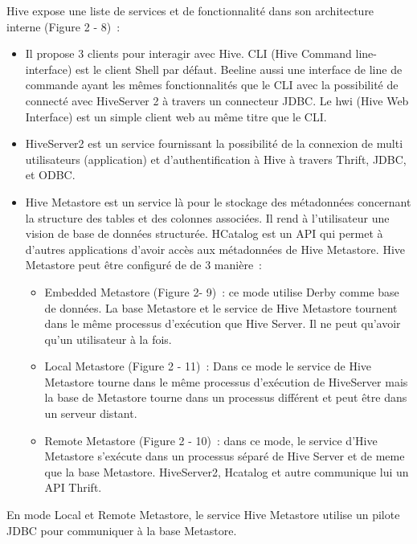 \documentclass[12pt,french]{book}
\begin{document}

Hive expose une liste de services et de fonctionnalité dans son architecture interne (Figure 2 - 8) :

\begin{itemize}
\item
Il propose 3 clients pour interagir avec Hive.  CLI (Hive Command line-interface) est le client Shell par défaut.  Beeline aussi une interface de line de commande ayant les mêmes fonctionnalités que le CLI avec la possibilité de connecté avec HiveServer 2 à travers un connecteur JDBC.  Le hwi (Hive Web Interface) est un simple client web au même titre que le CLI. 
\item
HiveServer2 est un service fournissant la possibilité de la connexion de multi utilisateurs (application) et d’authentification à Hive à travers Thrift, JDBC, et ODBC. 
\item
Hive Metastore est un service là pour le stockage des métadonnées concernant la structure des tables et des colonnes associées. Il rend à l’utilisateur une vision de base de données structurée. HCatalog est un API qui permet à d’autres applications d’avoir accès aux métadonnées de Hive Metastore. Hive Metastore peut être configuré de de 3 manière : 
	\begin{itemize}
	\item
	Embedded Metastore (Figure 2- 9) : ce mode utilise Derby comme base de données. La base Metastore et le service de Hive Metastore tournent dans le même processus d’exécution que Hive Server. Il ne peut qu’avoir qu’un utilisateur à la fois.
	\item
	Local Metastore (Figure 2 - 11) : Dans ce mode le service de Hive Metastore tourne dans le même processus d’exécution de HiveServer mais la base de Metastore tourne dans un processus différent et peut être dans un serveur distant.
	\item
	Remote Metastore (Figure 2 - 10) : dans ce mode, le service d’Hive Metastore s’exécute dans un processus séparé de Hive Server et de meme que la base Metastore. HiveServer2, Hcatalog et autre communique lui un API Thrift.
	\end{itemize}
\end{itemize}

En mode Local et Remote Metastore, le service Hive Metastore utilise un pilote JDBC pour communiquer à la base Metastore. 
\end{document}
